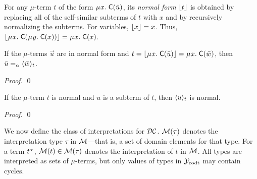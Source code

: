 For any $\mu$-term $t$ of the form $\MU x.\; \const C( \vec u )$,
its \emph{normal form} $\nf{t}$ is obtained
by replacing all of the self-similar subterms of $t$ with $x$
and by recursively normalizing the subterms.
For variables, $\nf{x} = x$.
Thus, $\nf{\MU x.\; \const{C}( \MU y.\; \const{C}( x ) )} = \MU x.\; \const{C}( x )$.

\begin{rep}
\begin{lemma}
\label{lem:mu-norm-arg}
If the $\mu$-terms $\vec u$ are in normal form and $t = \nf{\MU x.\; \const{C}( \vec u )} = \MU x.\; \const{C}( \vec w )$,
then $\vec u \vsim \interp{t}{\vec w}$\vthinspace.
\end{lemma}
\begin{proof}
\qed
\end{proof}

\begin{lemma}
\label{lem:mu-norm-interp}
If the $\mu$-term $t$ is normal and $u$ is a subterm of $t$, then $\interp{t}{u}$ is normal.
\end{lemma}
\begin{proof}
\qed
\end{proof}

\end{rep}

We now define the class of interpretations for $\thD$.
$\M( \tau )$ denotes the interpretation type $\tau$ in $\M$---that is, a set of
domain elements for that type.
For a term $t\typ{\tau}$, $\M( t ) \in \M( \tau )$ denotes the interpretation of $t$ in $\M$.
All types are interpreted as sets of $\mu$-terms, but
only values of types in $\Codata$ may contain cycles.

